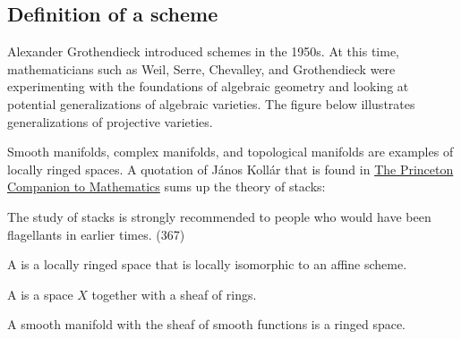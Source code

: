 \documentclass [11 pt, oneside, margin = 1 in] {article}
\begin{document}
\subsection{Definition of a scheme}
Alexander Grothendieck introduced schemes in the 1950s. At this time, mathematicians such as Weil, Serre, Chevalley, and Grothendieck were experimenting with the foundations of algebraic geometry and looking at potential generalizations of algebraic varieties. The figure below illustrates generalizations of projective varieties.
\begin{center}
\end{center}

Smooth manifolds, complex manifolds, and topological manifolds are examples of locally ringed spaces.
A quotation of János Kollár that is found in \underline{The Princeton Companion to Mathematics} sums up the theory of stacks: 
\begin{center}
	\small The study of stacks is strongly recommended to people who would have been flagellants in earlier times. (367)
\end{center}

\begin{definition}[ ]\label{}\text{}
A  is a locally ringed space that is locally isomorphic to an affine scheme.
\end{definition}

\begin{definition}[ ]\label{}\text{}
A  is a space $X$ together with a sheaf of rings.
\end{definition}

\begin{example}\label{}\text{}
	A smooth manifold with the sheaf of smooth functions is a ringed space.
\end{example}
\end{document}
